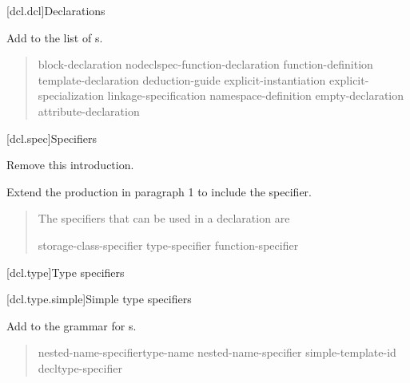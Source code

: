 
\setcounter{chapter}{6}
[dcl.dcl]{Declarations}

Add  to the list of s.

\begin{quote}
\begin{bnf}
\br
  block-declaration\br
  nodeclspec-function-declaration\br
  function-definition\br
  template-declaration\br
  deduction-guide\br
  explicit-instantiation\br
  explicit-specialization\br
  linkage-specification\br
  namespace-definition\br
  \br
  empty-declaration\br
  attribute-declaration
\end{bnf}
\end{quote}

[dcl.spec]{Specifiers}

Remove this introduction.

\begin{xremovedblock}
Extend the  production
in paragraph 1 to include the  specifier.

\begin{quote}
\pnum
The specifiers that can be used in a declaration are

\begin{bnf}
\br
    storage-class-specifier\br
    type-specifier\br
    function-specifier\br
    \br
    \br
    \br
\end{bnf}
\end{quote}
\end{xremovedblock}

\setcounter{subsection}{5}
[dcl.type]{Type specifiers}


\setcounter{subsubsection}{1}
[dcl.type.simple]{Simple type specifiers}
        
Add 
to the grammar for s.

\begin{quote}
\begin{bnf}
\br
    nested-name-specifier\opt type-name\br
    nested-name-specifier  simple-template-id\br
    \br
    \br
    \br
    \br
    \br
    \br
    \br
    \br
    \br
    \br
    \br
    \br
    \br
    \br
    decltype-specifier\br
\end{bnf}
\end{quote}

